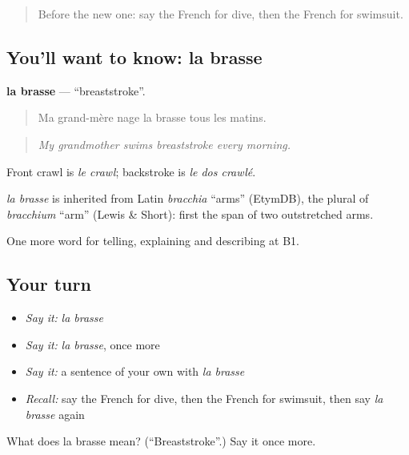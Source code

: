 \begin{quote}
Before the new one: say the French for dive, then the French for swimsuit.
\end{quote}

\subsection*{You'll want to know: la brasse}
\textbf{la brasse} — \textquotedblleft{}breaststroke\textquotedblright{}.

\begin{quote}
Ma grand-mère nage la brasse tous les matins.
\end{quote}

\begin{quote}
\emph{My grandmother swims breaststroke every morning.}
\end{quote}

Front crawl is \emph{le crawl}; backstroke is \emph{le dos crawlé}.

\begin{cousinweb}
\emph{la brasse} is inherited from Latin \emph{bracchia} \textquotedblleft{}arms\textquotedblright{} (EtymDB), the plural of \emph{bracchium} \textquotedblleft{}arm\textquotedblright{} (Lewis \& Short): first the span of two outstretched arms.
\end{cousinweb}

\begin{grammarlens}[title={What you've built}]
One more word for telling, explaining and describing at B1.
\end{grammarlens}

\subsection*{Your turn}
\begin{itemize}
\raggedright
  \item \emph{Say it:} \emph{la brasse}
  \item \emph{Say it:} \emph{la brasse}, once more
  \item \emph{Say it:} a sentence of your own with \emph{la brasse}
  \item \emph{Recall:} say the French for dive, then the French for swimsuit, then say \emph{la brasse} again
\end{itemize}

\begin{tcolorbox}[breakable,colback=teal!4,colframe=teal!35!black,title={Before you move on}]
What does la brasse mean? (\textquotedblleft{}Breaststroke\textquotedblright{}.) Say it once more.
\end{tcolorbox}
